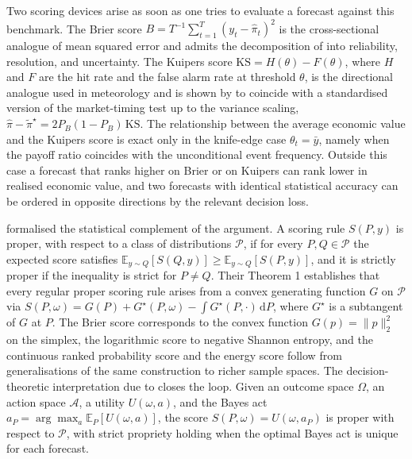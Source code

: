 Two scoring devices arise as soon as one tries to evaluate a forecast against this
benchmark. The Brier score \citep{Brier1950}
$B = T^{-1} \sum_{t=1}^T (y_t - \hat\pi_t)^2$ is the cross-sectional analogue of
mean squared error and admits the decomposition of \citet{Murphy1973} into
reliability, resolution, and uncertainty. The Kuipers score
$\mathrm{KS} = H(\theta) - F(\theta)$, where $H$ and $F$ are the hit rate and the
false alarm rate at threshold $\theta$, is the directional analogue used in
meteorology and is shown by \citet{GrangerPesaran2000} to coincide with a
standardised version of the \citet{PesaranTimmermann1992} market-timing test up to
the variance scaling, $\hat\pi - \tilde\pi^\star = 2 P_B (1 - P_B) \,\mathrm{KS}$.
The relationship between the average economic value and the Kuipers score is exact
only in the knife-edge case $\theta_t = \bar y$, namely when the payoff ratio
coincides with the unconditional event frequency. Outside this case a forecast that
ranks higher on Brier or on Kuipers can rank lower in realised economic value, and
two forecasts with identical statistical accuracy can be ordered in opposite
directions by the relevant decision loss.

\citet{GneitingRaftery2007} formalised the statistical complement of the argument.
A scoring rule $S(P, y)$ is proper, with respect to a class of distributions
$\mathcal P$, if for every $P, Q \in \mathcal P$ the expected score satisfies
$\mathbb E_{y \sim Q}[S(Q, y)] \ge \mathbb E_{y \sim Q}[S(P, y)]$, and it is strictly
proper if the inequality is strict for $P \neq Q$. Their Theorem 1 establishes that
every regular proper scoring rule arises from a convex generating function $G$ on
$\mathcal P$ via $S(P, \omega) = G(P) + G^\star(P, \omega) - \int G^\star(P, \cdot)\,
\mathrm dP$, where $G^\star$ is a subtangent of $G$ at $P$. The Brier score
corresponds to the convex function $G(p) = \|p\|_2^2$ on the simplex, the logarithmic
score to negative Shannon entropy, and the continuous ranked probability score and
the energy score follow from generalisations of the same construction to richer
sample spaces. The decision-theoretic interpretation due to \citet{Dawid1998} closes
the loop. Given an outcome space $\Omega$, an action space $\mathcal A$, a utility
$U(\omega, a)$, and the Bayes act $a_P = \arg\max_a \mathbb E_{P}[U(\omega, a)]$, the
score $S(P, \omega) = U(\omega, a_P)$ is proper with respect to $\mathcal P$, with
strict propriety holding when the optimal Bayes act is unique for each forecast.

